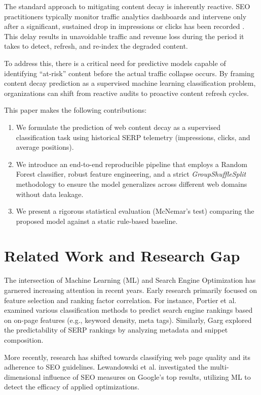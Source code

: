 \documentclass[conference]{IEEEtran}
\begin{document}
The standard approach to mitigating content decay is inherently reactive. SEO practitioners typically monitor traffic analytics dashboards and intervene only after a significant, sustained drop in impressions or clicks has been recorded \cite{shaffi2022machine}. This delay results in unavoidable traffic and revenue loss during the period it takes to detect, refresh, and re-index the degraded content.

To address this, there is a critical need for predictive models capable of identifying ``at-risk'' content before the actual traffic collapse occurs. By framing content decay prediction as a supervised machine learning classification problem, organizations can shift from reactive audits to proactive content refresh cycles.

This paper makes the following contributions:
\begin{enumerate}
    \item We formulate the prediction of web content decay as a supervised classification task using historical SERP telemetry (impressions, clicks, and average positions).
    \item We introduce an end-to-end reproducible pipeline that employs a Random Forest classifier, robust feature engineering, and a strict \textit{GroupShuffleSplit} methodology to ensure the model generalizes across different web domains without data leakage.
    \item We present a rigorous statistical evaluation (McNemar's test) comparing the proposed model against a static rule-based baseline.
\end{enumerate}

\section{Related Work and Research Gap}
The intersection of Machine Learning (ML) and Search Engine Optimization has garnered increasing attention in recent years. Early research primarily focused on feature selection and ranking factor correlation. For instance, Portier et al. \cite{portier2020predicting} examined various classification methods to predict search engine rankings based on on-page features (e.g., keyword density, meta tags). Similarly, Garg \cite{garg2021predicting} explored the predictability of SERP rankings by analyzing metadata and snippet composition.

More recently, research has shifted towards classifying web page quality and its adherence to SEO guidelines. Lewandowski et al. \cite{lewandowski2021seo} investigated the multi-dimensional influence of SEO measures on Google’s top results, utilizing ML to detect the efficacy of applied optimizations.
\end{document}
